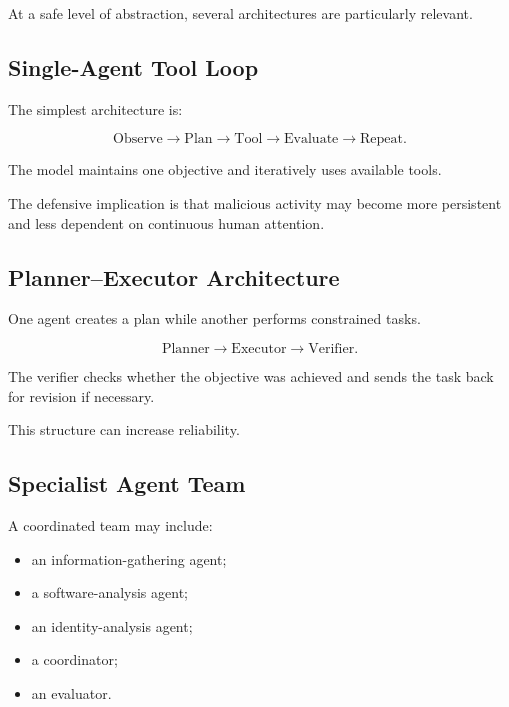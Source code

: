 At a safe level of abstraction, several architectures are particularly relevant.

\subsection{Single-Agent Tool Loop}

The simplest architecture is:

\begin{equation}
\text{Observe}
\rightarrow
\text{Plan}
\rightarrow
\text{Tool}
\rightarrow
\text{Evaluate}
\rightarrow
\text{Repeat}.
\end{equation}

The model maintains one objective and iteratively uses available tools.

The defensive implication is that malicious activity may become more persistent and less dependent on continuous human attention.

\subsection{Planner--Executor Architecture}

One agent creates a plan while another performs constrained tasks.

\begin{equation}
\text{Planner}
\rightarrow
\text{Executor}
\rightarrow
\text{Verifier}.
\end{equation}

The verifier checks whether the objective was achieved and sends the task back for revision if necessary.

This structure can increase reliability.

\subsection{Specialist Agent Team}

A coordinated team may include:

\begin{itemize}
    \item an information-gathering agent;
    \item a software-analysis agent;
    \item an identity-analysis agent;
    \item a coordinator;
    \item an evaluator.
\end{itemize}

